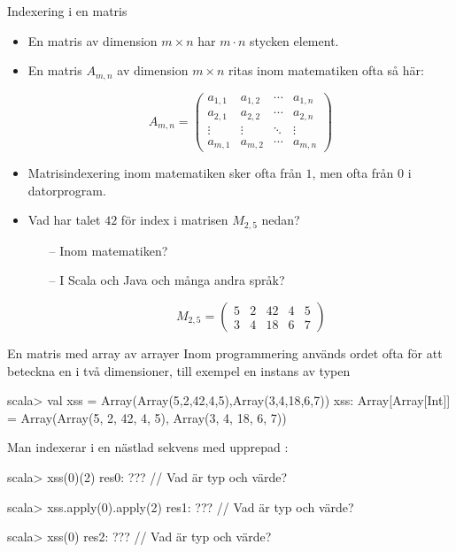 \begin{Slide}{Indexering i en matris}\SlideFontSmall
\begin{itemize}

  \item En matris av dimension $m\times{}n$ har $m \cdot n$ stycken element.

  \item En matris $A_{m,n}$ av dimension $m\times{}n$ ritas inom matematiken ofta så här:

  \[
  A_{m,n} =
   \begin{pmatrix}
    a_{1,1} & a_{1,2} & \cdots & a_{1,n} \\
    a_{2,1} & a_{2,2} & \cdots & a_{2,n} \\
    \vdots  & \vdots  & \ddots & \vdots  \\
    a_{m,1} & a_{m,2} & \cdots & a_{m,n}
   \end{pmatrix}
  \]


\item Matrisindexering inom matematiken sker ofta från $1$, men ofta från $0$ i datorprogram.

\item Vad har talet $42$ för index i matrisen $M_{2,5}$ nedan?
\begin{itemize}\SlideFontTiny
  \item[--] Inom matematiken?
  \item[--] I Scala och Java och många andra språk?

  \[
  M_{2,5}=
    \begin{pmatrix}
      5 & 2 & 42 & 4 & 5 \\
      3 & 4 & 18 & 6 & 7
    \end{pmatrix}
  \]
\end{itemize}
\end{itemize}
\end{Slide}

\begin{Slide}{En matris med array av arrayer}
Inom programmering används ordet  ofta för att beteckna en  i två dimensioner, till exempel en instans av typen 
\begin{REPL}
scala> val xss = Array(Array(5,2,42,4,5),Array(3,4,18,6,7))
xss: Array[Array[Int]] = Array(Array(5, 2, 42, 4, 5), Array(3, 4, 18, 6, 7))
\end{REPL}
\pause
Man indexerar i en nästlad sekvens med upprepad :
\begin{REPL}
scala> xss(0)(2)
res0: ???                   // Vad är typ och värde?

scala> xss.apply(0).apply(2)
res1: ???                   // Vad är typ och värde?

scala> xss(0)
res2: ???                   // Vad är typ och värde?
\end{REPL}

\end{Slide}

